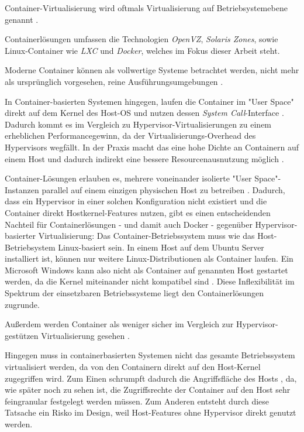 \documentclass[11pt,a4paper,oneside]{report}
\begin{document}
      Container-Virtualisierung wird oftmals Virtualisierung auf Betriebsystemebene genannt \cite[S.6]{dockerBook}.

      Containerlösungen umfassen die Technologien \emph{OpenVZ}, \emph{Solaris Zones}, sowie Linux-Container wie \emph{LXC} \cite[S.7]{dockerBook} und \emph{Docker}, welches im Fokus dieser Arbeit steht.

      Moderne Container können als vollwertige Systeme betrachtet werden, nicht mehr als ursprünglich vorgesehen, reine Ausführungsumgebungen \cite[S.7]{dockerBook}.

      In Container-basierten Systemen hingegen, laufen die Container im "User Space" direkt auf dem Kernel des Host-OS und nutzen dessen \emph{System Call}-Interface \cite[S.6+7]{dockerBook}. Dadurch kommt es im Vergleich zu Hypervisor-Virtualisierungen zu einem erheblichen Performancegewinn, da der Virtualisierungs-Overhead des Hypervisors wegfällt. In der Praxis macht das eine hohe Dichte an Containern auf einem Host und dadurch indirekt eine bessere Resourcenausnutzung möglich \cite[S.7+8]{dockerBook}.

      Container-Lösungen erlauben es, mehrere voneinander isolierte "User Space"-Instanzen parallel auf einem einzigen physischen Host zu betreiben \cite[S.6]{dockerBook}. Dadurch, dass ein Hypervisor in einer solchen Konfiguration nicht existiert und die Container direkt Hostkernel-Features nutzen, gibt es einen entscheidenden Nachteil für Containerlösungen - und damit auch Docker - gegenüber Hypervisor-basierter Virtualisierung: Das Container-Betriebssystem muss wie das Host-Betriebsystem Linux-basiert sein. In einem Host auf dem Ubuntu Server installiert ist, können nur weitere Linux-Distributionen als Container laufen. Ein Microsoft Windows kann also nicht als Container auf genannten Host gestartet werden, da die Kernel miteinander nicht kompatibel sind \cite[S.6]{dockerBook}. Diese Inflexibilität im Spektrum der einsetzbaren Betriebssysteme liegt den Containerlösungen zugrunde.

      Außerdem werden Container als weniger sicher im Vergleich zur Hypervisor-gestützen Virtualisierung gesehen \cite[S.6]{dockerBook}.

      Hingegen muss in containerbasierten Systemen nicht das gesamte Betriebssystem virtualisiert werden, da von den Containern direkt auf den Host-Kernel zugegriffen wird. Zum Einen schrumpft dadurch die Angriffsfläche des Hosts \cite[S.6]{dockerBook}, da, wie später noch zu sehen ist, die Zugriffsrechte der Container auf den Host sehr feingranular festgelegt werden müssen. Zum Anderen entsteht durch diese Tatsache ein Risko im Design, weil Host-Features ohne Hypervisor direkt genutzt werden.
\end{document}
